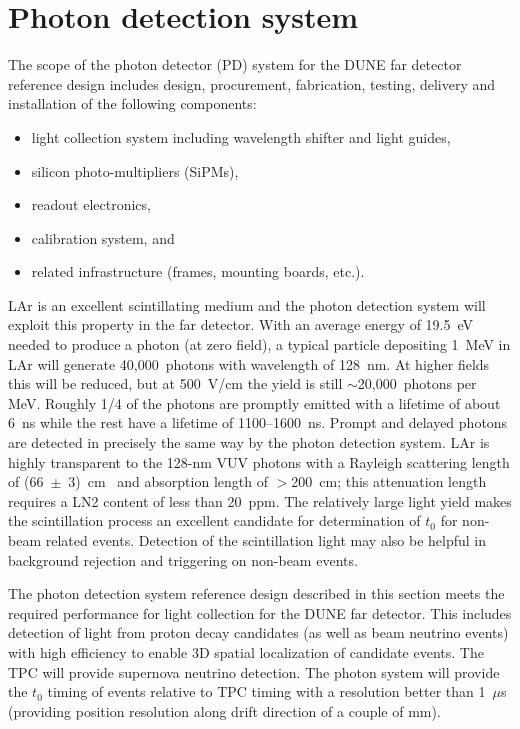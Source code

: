 
\section{Photon detection system}

The scope of the photon detector (PD) system for the DUNE far detector
reference design includes design, procurement, fabrication,
testing, delivery and installation of the following components:
\begin{itemize}
\item light collection system including wavelength shifter and light guides,
\item silicon photo-multipliers (SiPMs),
\item readout electronics,
\item calibration system, and
\item related infrastructure (frames, mounting boards, etc.).
\end{itemize}

LAr is an excellent scintillating medium and the photon detection
system will exploit this property in the far detector.  With an
average energy of 19.5~eV needed to produce a photon (at zero field),
a typical particle depositing 1~MeV in LAr will generate
40,000~photons with wavelength of 128~nm. At higher fields this will
be reduced, but at 500~V/cm the yield is still $\sim$20,000~photons
per MeV. Roughly 1/4 of the photons are promptly emitted with a
lifetime of about 6~ns while the rest have a lifetime of
1100--1600~ns. Prompt and delayed photons are detected in
  precisely the same way by the photon detection system. LAr is
highly transparent to the 128-nm VUV photons with a Rayleigh
scattering length of (66~$\pm$~3)~cm~\cite{Rayleigh} and absorption
length of $>$200~cm; this attenuation length requires a LN2
  content of less than 20~ppm. The relatively large light yield makes
the scintillation process an excellent candidate for determination of
$t_0$ for non-beam related events. Detection of the scintillation
light may also be helpful in background rejection and triggering on
non-beam events.

The photon detection system reference design described in this section
meets the required performance for light collection for the DUNE far
detector. This includes detection of light from proton decay
candidates (as well as beam neutrino events) with high efficiency to
enable 3D spatial localization of candidate events. The TPC will
provide supernova neutrino detection. 
The photon system will provide the $t_0$ timing of
events relative to TPC timing with a resolution better than 1~$\mu$s
(providing position resolution along drift direction of a couple of mm). 

